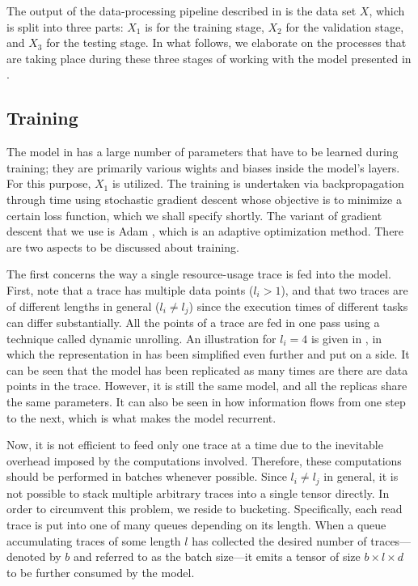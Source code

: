 The output of the data-processing pipeline described in  is the data
set $X$, which is split into three parts: $X_1$ is for the training stage, $X_2$
for the validation stage, and $X_3$ for the testing stage. In what follows, we
elaborate on the processes that are taking place during these three stages of
working with the model presented in .

\subsection{Training} 
The model in  has a large number of parameters that have to be
learned during training; they are primarily various wights and biases inside the
model's layers. For this purpose, $X_1$ is utilized. The training is undertaken
via backpropagation through time using stochastic gradient descent
\cite{goodfellow2016} whose objective is to minimize a certain loss function,
which we shall specify shortly. The variant of gradient descent that we use is
Adam \cite{kingma2014}, which is an adaptive optimization method. There are two
aspects to be discussed about training.


The first concerns the way a single resource-usage trace is fed into the model.
First, note that a trace has multiple data points ($l_i > 1$), and that two
traces are of different lengths in general ($l_i \neq l_j$) since the execution
times of different tasks can differ substantially. All the points of a trace are
fed in one pass using a technique called dynamic unrolling. An illustration for
$l_i = 4$ is given in , in which the representation in 
has been simplified even further and put on a side. It can be seen that the
model has been replicated as many times are there are data points in the trace.
However, it is still the same model, and all the replicas share the same
parameters. It can also be seen in  how information flows from one
step to the next, which is what makes the model recurrent.

Now, it is not efficient to feed only one trace at a time due to the inevitable
overhead imposed by the computations involved. Therefore, these computations
should be performed in batches whenever possible. Since $l_i \neq l_j$ in
general, it is not possible to stack multiple arbitrary traces into a single
tensor directly. In order to circumvent this problem, we reside to bucketing.
Specifically, each read trace is put into one of many queues depending on its
length. When a queue accumulating traces of some length $l$ has collected the
desired number of traces---denoted by $b$ and referred to as the batch size---it
emits a tensor of size $b \times l \times d$ to be further consumed by the
model.

